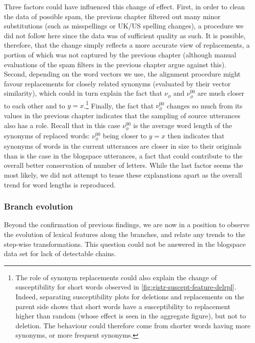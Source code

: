 \documentclass[a4paper,fleqn]{cas-dc}
\begin{document}
Three factors could have influenced this change of effect. First, in
order to clean the data of possible spam, the previous chapter filtered
out many minor substitutions (such as misspellings or UK/US spelling
changes), a procedure we did not follow here since the data was of
sufficient quality as such. It is possible, therefore, that the change
simply reflects a more accurate view of replacements, a portion of which
was not captured by the previous chapter (although manual evaluations of
the spam filters in the previous chapter argue against this). Second,
depending on the word vectors we use, the alignment procedure might
favour replacements for closely related synonyms (evaluated by their
vector similarity), which could in turn explain the fact that
\(\nu_{\phi}\) and \(\nu_{\phi}^{00}\) are much closer to each other and
to \(y = x\).\footnote{The role of synonym replacements could also
  explain the change of susceptibility for short words observed in
  \cref{fig:gistr-suscept-feature-delrpl}. Indeed, separating
  susceptibility plots for deletions and replacements on the parent side
  shows that short words have a susceptibility to replacement higher
  than random (whose effect is seen in the aggregate figure), but not to
  deletion. The behaviour could therefore come from shorter words having
  more synonyms, or more frequent synonyms.} Finally, the fact that
\(\nu_{\phi}^{00}\) changes so much from its values in the previous
chapter indicates that the sampling of source utterances also has a
role. Recall that in this case \(\nu_{\phi}^{00}\) is the average word
length of the synonyms of replaced words: \(\nu_{\phi}^{00}\) being
closer to \(y = x\) then indicates that synonyms of words in the current
utterances are closer in size to their originals than is the case in the
blogspace utterances, a fact that could contribute to the overall better
conservation of number of letters. While the last factor seems the most
likely, we did not attempt to tease these explanations apart as the
overall trend for word lengths is reproduced.

\subsubsection{Branch evolution}\label{branch-evolution}

Beyond the confirmation of previous findings, we are now in a position
to observe the evolution of lexical features along the branches, and
relate any trends to the step-wise transformations. This question could
not be answered in the blogspace data set for lack of detectable chains.
\end{document}
